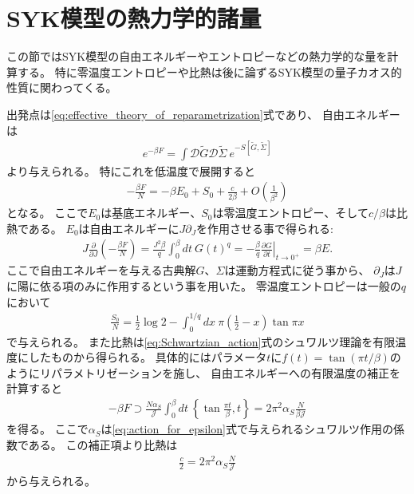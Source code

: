 \section{SYK模型の熱力学的諸量\label{sec:thermodynamics}}
この節ではSYK模型の自由エネルギーやエントロピーなどの熱力学的な量を計算する。
特に零温度エントロピーや比熱は後に論ずるSYK模型の量子カオス的性質に関わってくる。

出発点は\eqref{eq:effective_theory_of_reparametrization}式であり、
自由エネルギーは
\begin{align}
	e^{-\beta F} = \int \mathcal{D}\tilde{G}\mathcal{D}\tilde{\Sigma}\ 
		e^{-S[\tilde{G}, \tilde{\Sigma}]}
\end{align}
より与えられる。
特にこれを低温度で展開すると
\begin{align}
	-\frac{\beta F}{N}
	= -\beta E_0 + S_0 + \frac{c}{2\beta} + O\left(\frac{1}{\beta^2}\right)
\end{align}
となる。
ここで$E_0$は基底エネルギー、$S_0$は零温度エントロピー、そして$c/\beta$は比熱である。
$E_0$は自由エネルギーに$J\partial_J$を作用させる事で得られる:
\begin{align}
	J\frac{\partial}{\partial J}\left(-\frac{\beta F}{N}\right)
	= \frac{J^2\beta}{q}\int_0^{\beta}dt\ G(t)^q
	= -\frac{\beta}{q}\left.\frac{\partial G}{\partial t}\right|_{t\to 0^+}
	= \beta E.
\end{align}
ここで自由エネルギーを与える古典解$G$、$\Sigma$は運動方程式に従う事から、
$\partial_J$は$J$に陽に依る項のみに作用するという事を用いた。
零温度エントロピーは一般の$q$において
\begin{align}
	\frac{S_0}{N}
	= \frac{1}{2}\log 2 - \int_0^{1/q} dx\ \pi\left(\frac{1}{2} - x\right)\tan \pi x
\end{align}
で与えられる。
また比熱は\eqref{eq:Schwartzian_action}式のシュワルツ理論を有限温度にしたものから得られる。
具体的にはパラメータ$t$に$f(t) = \tan(\pi t / \beta)$のようにリパラメトリゼーションを施し、
自由エネルギーへの有限温度の補正を計算すると
\begin{align}
	-\beta F \supset \frac{N \alpha_S}{\mathcal{J}}
		\int_0^{\beta} dt\ \left\{\tan \frac{\pi t}{\beta}, t\right\}
	= 2\pi^2\alpha_S\frac{N}{\beta \mathcal{J}}
\end{align}
を得る。
ここで$\alpha_S$は\eqref{eq:action_for_epsilon}式で与えられるシュワルツ作用の係数である。
この補正項より比熱は
\begin{align}
	\frac{c}{2} = 2\pi^2\alpha_S\frac{N}{\mathcal{J}}
	\label{eq:specific_heat}
\end{align}
から与えられる。

\pagebreak